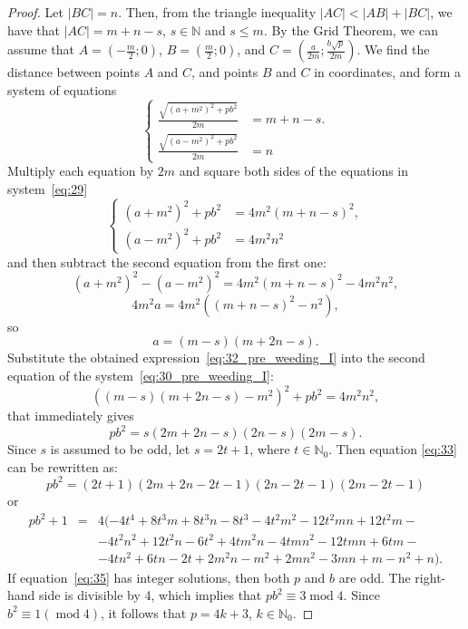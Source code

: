 \documentclass[a4paper,14pt]{article} %
\theoremstyle{plain}
\theoremstyle{definition}
\begin{document}
\begin{proof}
	Let $|BC| = n$. Then, from the triangle inequality $|AC| < |AB| + |BC|$, we have that $|AC| = m + n - s$, $s \in \mathbb{N}$ and $s \leq m$.
	By the Grid Theorem, we can assume that $A = (-\frac{m}{2}; 0)$, $B = (\frac{m}{2}; 0)$, and $C = (\frac{a}{2m}; \frac{b\sqrt{p}}{2m})$. We find the distance between points $A$ and $C$, and points $B$ and $C$ in coordinates, and form a system of equations
	\begin{equation}
		\label{eq:29}
		\begin{cases}
		\frac{\sqrt{(a+m^2)^2+pb^2}}{2m}&=m+n-s.\\
		\frac{\sqrt{(a-m^2)^2+pb^2}}{2m}&=n
		\end{cases}
	\end{equation}
	Multiply each equation by $2m$ and square both sides of the equations in system~\eqref{eq:29}
	\begin{equation}
		\label{eq:30_pre_weeding_I}
		\begin{cases}
		(a+m^2)^2+pb^2&=4m^2(m+n-s)^2,\\
		(a-m^2)^2+pb^2&=4m^2n^2
		\end{cases}
	\end{equation}
	and then subtract the second equation from the first one:
	\begin{equation}
	(a+m^2)^2-(a-m^2)^2=4m^2(m+n-s)^2-4m^2n^2,
	\label{eq: 31}
	\end{equation}
	$$
	4m^2a=4m^2((m+n-s)^2-n^2),
	$$
	so
	\begin{equation}
		\label{eq:32_pre_weeding_I}
		a=(m-s)(m+2n-s).
	\end{equation}
	Substitute the obtained expression~\eqref{eq:32_pre_weeding_I}
	into the second equation of the system~\eqref{eq:30_pre_weeding_I}:
	\begin{equation}
		((m-s)(m+2n-s)-m^2)^2+pb^2=4m^2n^2,
	\end{equation}
	that immediately gives
	\begin{equation}
		\label{eq:33}
		pb^2=s(2m+2n-s)(2n-s)(2m-s).
	\end{equation}
	Since $s$ is assumed to be odd, let $s=2t+1$, where $t\in\mathbb{N}_0$.
	Then equation \eqref{eq:33} can be rewritten as:
	\begin{equation}
		\label{eq:34.2}
		pb^2=(2t+1)(2m+2n-2t-1)(2n-2t-1)(2m-2t-1)
	\end{equation}
	or
	\begin{eqnarray}
		pb^2+1 &=&4(-4t^4+8t^3m+8t^3n-8t^3-4t^2m^2-12t^2mn+12t^2m- {}\nonumber\\
			 &     &-4t^2n^2+12t^2n-6t^2+4tm^2n-4tmn^2-12tmn+6tm- {}\nonumber\\
			 &     &-4tn^2+6tn-2t+2m^2n-m^2+2mn^2-3mn+m-n^2+n).%
	\label{eq:35}
	\end{eqnarray}
	If equation~\eqref{eq:35} has integer solutions, then both $p$ and $b$ are odd.
	The right-hand side is divisible by 4, which implies that  $pb^2\equiv3\operatorname{mod}{4}$.
	Since $b^{2}\equiv1(\operatorname{mod}4)$, it follows that $p=4k+3$, $k\in \mathbb{N}_{0}$.
\end{proof}
\end{document}
